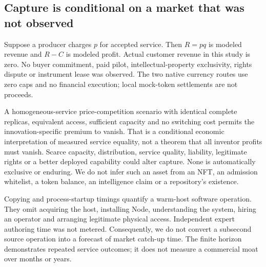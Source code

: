 \SensitivityResults

\subsection{Capture is conditional on a market that was not observed}
Suppose a producer charges $p$ for accepted service. Then $R=pq$ is modeled revenue and $R-C$ is modeled profit. Actual customer revenue in this study is zero. No buyer commitment, paid pilot, intellectual-property exclusivity, rights dispute or instrument lease was observed. The two native currency routes use zero caps and no financial execution; local mock-token settlements are not proceeds.

A homogeneous-service price-competition scenario with identical complete replicas, equivalent access, sufficient capacity and no switching cost permits the innovation-specific premium to vanish. That is a conditional economic interpretation of measured service equality, not a theorem that all inventor profits must vanish. Scarce capacity, distribution, service quality, liability, legitimate rights or a better deployed capability could alter capture. None is automatically exclusive or enduring. We do not infer such an asset from an NFT, an admission whitelist, a token balance, an intelligence claim or a repository's existence.

Copying and process-startup timings quantify a warm-host software operation. They omit acquiring the host, installing Node, understanding the system, hiring an operator and arranging legitimate physical access. Independent expert authoring time was not metered. Consequently, we do not convert a subsecond source operation into a forecast of market catch-up time. The finite horizon demonstrates repeated service outcomes; it does not measure a commercial moat over months or years.

